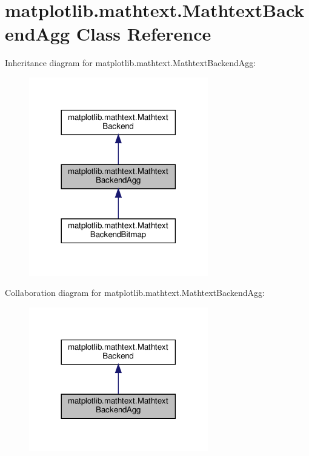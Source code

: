\hypertarget{classmatplotlib_1_1mathtext_1_1MathtextBackendAgg}{}\section{matplotlib.\+mathtext.\+Mathtext\+Backend\+Agg Class Reference}
\label{classmatplotlib_1_1mathtext_1_1MathtextBackendAgg}


Inheritance diagram for matplotlib.\+mathtext.\+Mathtext\+Backend\+Agg\+:
\nopagebreak
\begin{figure}[H]
\begin{center}
\leavevmode
\includegraphics[width=221pt]{classmatplotlib_1_1mathtext_1_1MathtextBackendAgg__inherit__graph}
\end{center}
\end{figure}


Collaboration diagram for matplotlib.\+mathtext.\+Mathtext\+Backend\+Agg\+:
\nopagebreak
\begin{figure}[H]
\begin{center}
\leavevmode
\includegraphics[width=221pt]{classmatplotlib_1_1mathtext_1_1MathtextBackendAgg__coll__graph}
\end{center}
\end{figure}

